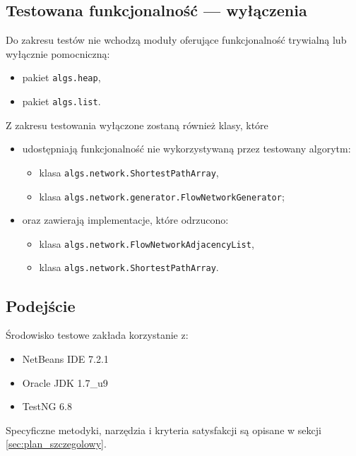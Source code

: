 \subsection{Testowana funkcjonalność --- wyłączenia}
Do zakresu testów nie wchodzą moduły oferujące funkcjonalność trywialną lub
wyłącznie pomocniczną:
\begin{itemize}
    \item pakiet \texttt{algs.heap},
    \item pakiet \texttt{algs.list}.
\end{itemize}
Z zakresu testowania wyłączone zostaną również klasy, które
\begin{itemize}
    \item udostępniają funkcjonalność nie wykorzystywaną przez testowany algorytm:
        \begin{itemize}
            \item klasa \texttt{algs.network.ShortestPathArray},
            \item klasa \texttt{algs.network.generator.FlowNetworkGenerator};
        \end{itemize}
    \item oraz zawierają implementacje, które odrzucono:
        \begin{itemize}
            \item klasa \texttt{algs.network.FlowNetworkAdjacencyList},
            \item klasa \texttt{algs.network.ShortestPathArray}.
        \end{itemize}
\end{itemize}


\subsection{Podejście}
Środowisko testowe zakłada korzystanie z:
\begin{itemize}
    \item NetBeans IDE 7.2.1
    \item Oracle JDK 1.7\_u9
    \item TestNG 6.8
\end{itemize}

\noindent
Specyficzne metodyki, narzędzia i kryteria satysfakcji są opisane w sekcji
\ref{sec:plan_szczegolowy}.
